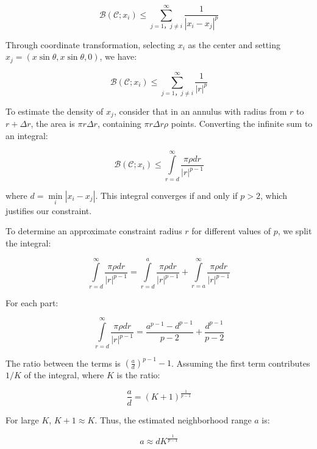 \begin{equation}
\mathcal{B}(\mathcal{C}; x_i)\le \sum\limits_{j=1，j\neq i}^\infty \frac{1}{|x_i-x_j|^p}
\end{equation}

Through coordinate transformation, selecting $x_i$ as the center and setting $x_j=(x\sin\theta,x\sin\theta,0)$, we have:

\begin{equation}
\mathcal{B}(\mathcal{C}; x_i)\le \sum\limits_{j=1，j\neq i}^\infty \frac{1}{|r|^p}
\end{equation}

To estimate the density of $x_j$, consider that in an annulus with radius from $r$ to $r+\Delta r$, the area is $\pi r \Delta r$, containing $\pi r \Delta r \rho$ points. Converting the infinite sum to an integral:

\begin{equation}
\mathcal{B}(\mathcal{C}; x_i)\le \int\limits_{r=d}^\infty \frac{\pi \rho dr}{|r|^{p-1}}
\end{equation}

where $d=\min\limits_i|x_i-x_j|$. This integral converges if and only if $p>2$, which justifies our constraint.

To determine an approximate constraint radius $r$ for different values of $p$, we split the integral:

\begin{equation}
\int\limits_{r=d}^\infty \frac{\pi \rho dr}{|r|^{p-1}} = \int\limits_{r=d}^a \frac{\pi \rho dr}{|r|^{p-1}} + \int\limits_{r=a}^\infty \frac{\pi \rho dr}{|r|^{p-1}}
\end{equation}

For each part:

\begin{equation}
\int\limits_{r=d}^\infty \frac{\pi \rho dr}{|r|^{p-1}} = \frac{a^{p-1}-d^{p-1}}{p-2} + \frac{d^{p-1}}{p-2}
\end{equation}

The ratio between the terms is $(\frac{a}{d})^{p-1}-1$. Assuming the first term contributes $1/K$ of the integral, where $K$ is the ratio:

\begin{equation}
\frac{a}{d}= (K+1)^{\frac{1}{p-1}}
\end{equation}

For large $K$, $K+1 \approx K$. Thus, the estimated neighborhood range $a$ is:

\begin{equation}
a \approx dK^{\frac{1}{p-1}}
\end{equation}

